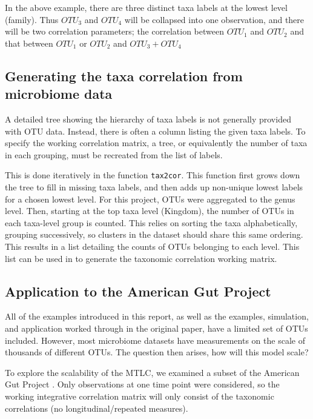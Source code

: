 \documentclass[12pt]{article}
\begin{document}
In the above example, there are three distinct taxa labels at the lowest level (family). Thus $OTU_3$ and $OTU_4$ will be collapsed into one observation, and there will be two correlation parameters; the correlation between $OTU_1$ and $OTU_2$ and that between $OTU_1$ or $OTU_2$ and $OTU_3 + OTU_4$

\subsection{Generating the taxa correlation from microbiome data}

A detailed tree showing the hierarchy of taxa labels is not generally provided with OTU data. Instead, there is often a column listing the given taxa labels. To specify the working correlation matrix, a tree, or equivalently the number of taxa in each grouping, must be recreated from the list of labels.

This is done iteratively in the function \texttt{tax2cor}. This function first grows down the tree to fill in missing taxa labels, and then adds up non-unique lowest labels for a chosen lowest level. For this project, OTUs were aggregated to the genus level. Then, starting at the top taxa level (Kingdom), the number of OTUs in each taxa-level group is counted. This relies on sorting the taxa alphabetically, grouping successively, so clusters in the dataset should share this same ordering. This results in a list detailing the counts of OTUs belonging to each level. This list can be used in to generate the taxonomic correlation working matrix.



\subsection{Application to the American Gut Project}

All of the examples introduced in this report, as well as the examples, simulation, and application worked through in the original paper, have a limited set of OTUs included. However, most microbiome datasets have measurements on the scale of thousands of different OTUs. The question then arises, how will this model scale?

To explore the scalability of the MTLC, we examined a subset of the American Gut Project \cite{mayer2015gut}. Only observations at one time point were considered, so the working integrative correlation matrix will only consist of the taxonomic correlations (no longitudinal/repeated measures).
\end{document}
